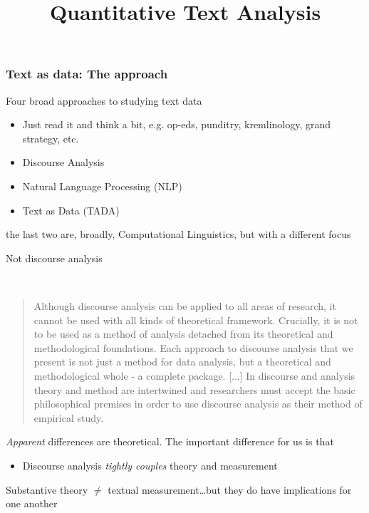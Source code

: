 \documentclass{hertieteaching}\usepackage[]{graphicx}\usepackage[]{color}
\title{Quantitative Text Analysis}
\begin{document}
{ 
\begin{frame}
\titlepage
\end{frame}
} %
\addtocounter{page}{-1}


\begin{frame}
\frametitle{Text as data: The approach}



Four broad approaches to studying text data
\begin{itemize}
  \item Just read it and think a bit, e.g. op-eds, punditry, kremlinology, grand strategy, etc.
  \item Discourse Analysis
  \item Natural Language Processing (NLP)
  \item Text as Data (TADA)
\end{itemize}
the last two are, broadly, Computational Linguistics,
but with a different focus

\end{frame}
\begin{frame}{Not discourse analysis}

~\\
\begin{quote}
Although discourse analysis can be applied to all areas of
research, it cannot be used with all kinds of theoretical
framework. Crucially, it is not to be used as a method of
analysis detached from its theoretical and methodological
foundations. Each approach to discourse analysis that
we present is not just a method for data analysis, but a
theoretical and methodological whole - a complete package.
[...] In discourse and analysis theory and method are
intertwined and researchers must accept the basic
philosophical premises in order to use discourse analysis as
their method of empirical study.\\
\hfill\parencite{Jorgensen.Phillips2002}
\end{quote}

\textit{Apparent} differences are theoretical. The important difference for us is that
\begin{itemize}
  \item Discourse analysis \textit{tightly couples} theory and measurement
\end{itemize}

Substantive theory $\neq$ textual measurement\ldots but they do have implications for one another

\end{frame}
\end{document}
